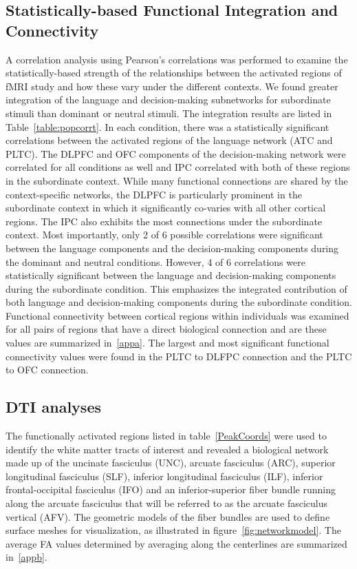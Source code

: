 \subsection{Statistically-based Functional Integration and Connectivity}
A correlation analysis using Pearson's correlations was performed to examine the statistically-based strength of the relationships between the activated regions of fMRI study and how these vary under the different contexts. We found greater integration of the language and decision-making subnetworks for subordinate stimuli than dominant or neutral stimuli. The integration results are listed in Table~\ref{table:popcorrt}. In each condition, there was a statistically significant correlations between the activated regions of the language network (ATC and PLTC). The DLPFC and OFC components of the decision-making network were correlated for all conditions as well and IPC correlated with both of these regions in the subordinate context.  While many functional connections are shared by the context-specific networks, the DLPFC is particularly prominent in the subordinate context in which it significantly co-varies with all other cortical regions. The IPC also exhibits the most connections under the subordinate context. Most importantly, only 2 of 6 possible correlations were significant between the language components and the decision-making components during the dominant and neutral conditions. However, 4 of 6 correlations were statistically significant between the language and decision-making components during the subordinate condition. This emphasizes the integrated contribution of both language and decision-making components during the subordinate condition. Functional connectivity between cortical regions within individuals was examined for all pairs of regions that have a direct biological connection and are these values are summarized in~\ref{appa}. The largest and most significant functional connectivity values were found in the PLTC to DLFPC connection and the PLTC to OFC connection. 

\subsection{DTI analyses}
The functionally activated regions listed in table~\ref{PeakCoords} were used to identify the white matter tracts of interest and revealed a biological network made up of the uncinate fasciculus (UNC), arcuate fasciculus (ARC), superior longitudinal fasciculus (SLF), inferior longitudinal fasciculus (ILF), inferior frontal-occipital fasciculus (IFO) and an inferior-superior fiber bundle running along the arcuate fasciculus that will be referred to as the arcuate fasciculus vertical (AFV). The geometric models of the fiber bundles are used to define surface meshes for visualization, as illustrated in figure~\ref{fig:networkmodel}. The average FA values determined by averaging along the centerlines are summarized in~\ref{appb}. 

